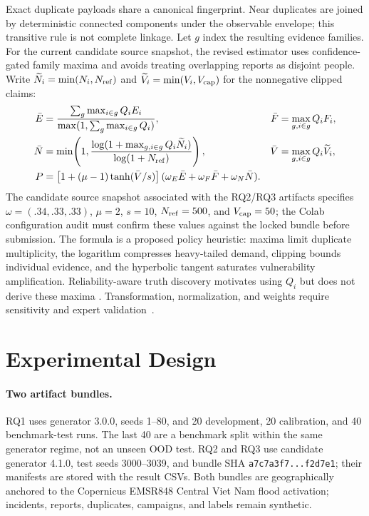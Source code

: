 \documentclass[runningheads]{llncs}
\begin{document}
Exact duplicate payloads share a canonical fingerprint. Near duplicates are
joined by deterministic connected components under the observable envelope;
this transitive rule is not complete linkage. Let $g$ index the resulting
evidence families. For the current candidate source snapshot, the revised
estimator uses confidence-gated family maxima and avoids treating overlapping
reports as disjoint people. Write
$\widetilde N_i=\min(N_i,N_{\rm ref})$ and
$\widetilde V_i=\min(V_i,V_{\rm cap})$ for the nonnegative clipped claims:
\begin{align}
\bar E&=\frac{\sum_g\max_{i\in g}Q_iE_i}
 {\max(1,\sum_g\max_{i\in g}Q_i)},&
\bar F&=\max_{g,i\in g}Q_iF_i,\nonumber\\
\bar N&=\min\!\left(1,\frac{\log(1+\max_{g,i\in g}Q_i\widetilde N_i)}
 {\log(1+N_{\rm ref})}\right),&
\bar V&=\max_{g,i\in g}Q_i\widetilde V_i,\nonumber\\
P&=\left[1+(\mu-1)\tanh(\bar V/s)\right]
 (\omega_E\bar E+\omega_F\bar F+\omega_N\bar N).
\label{eq:priority}
\end{align}
The candidate source snapshot associated with the RQ2/RQ3 artifacts specifies
$\omega=(.34,.33,.33)$, $\mu=2$, $s=10$, $N_{\rm ref}=500$, and
$V_{\rm cap}=50$; the Colab configuration audit must confirm these values
against the locked bundle before submission. The formula is a proposed
policy heuristic: maxima limit duplicate multiplicity, the logarithm
compresses heavy-tailed demand, clipping bounds individual evidence, and the
hyperbolic tangent saturates vulnerability amplification. Reliability-aware
truth discovery motivates using $Q_i$ but does not derive these maxima
\cite{wang2012truth}. Transformation, normalization, and weights require
sensitivity and expert validation~\cite{tate2012vulnerability,gralla2014review}.

\section{Experimental Design}

\paragraph{Two artifact bundles.}
RQ1 uses generator 3.0.0, seeds 1--80, and 20 development, 20 calibration,
and 40 benchmark-test runs. The last 40 are a benchmark split within the
same generator regime, not an unseen OOD test. RQ2 and RQ3 use candidate
generator 4.1.0, test seeds 3000--3039, and bundle SHA
\texttt{a7c7a3f7...f2d7e1}; their manifests are stored with the result CSVs.
Both bundles are geographically anchored to the Copernicus EMSR848 Central
Viet Nam flood activation; incidents, reports, duplicates, campaigns, and
labels remain synthetic.
\end{document}
